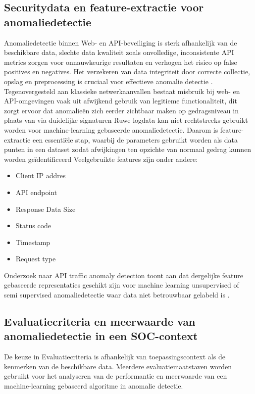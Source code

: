 \subsection{Securitydata en feature-extractie voor anomaliedetectie }

Anomaliedetectie binnen Web- en API-beveiliging is sterk afhankelijk van de beschikbare data, slechte data kwaliteit zoals onvolledige, inconsistente API metrics zorgen voor onnauwkeurige resultaten en verhogen het risico op false positives en negatives. Het verzekeren van data integriteit door correcte collectie, opslag en preprocessing is cruciaal voor effectieve anomalie detectie \Autocite{Meegle2025}.
Tegenovergesteld aan klassieke netwerkaanvallen bestaat misbruik bij web- en API-omgevingen vaak uit afwijkend gebruik van legitieme functionaliteit, dit zorgt ervoor dat anomalieën zich eerder zichtbaar maken op gedragsniveau in plaats van via duidelijke signaturen \Autocite{OWASP2023}
Ruwe logdata kan niet rechtstreeks gebruikt worden voor machine-learning gebaseerde anomaliedetectie. Daarom is feature-extractie een essentiële stap, waarbij de parameters gebruikt worden als data punten in een dataset zodat afwijkingen ten opzichte van normaal gedrag kunnen worden geïdentificeerd Veelgebruikte features zijn onder andere: 

\begin{itemize}
    \item Client IP addres
    \item API endpoint 
    \item Response Data Size
    \item Status code 
    \item Timestamp
    \item Request type
\end{itemize}

Onderzoek naar API traffic anomaly detection toont aan dat dergelijke feature gebaseerde representaties geschikt zijn voor machine learning unsupervised of semi supervised anomaliedetectie waar data niet betrouwbaar gelabeld is \Autocite{Sowmya2023}.


\subsection{Evaluatiecriteria en meerwaarde van anomaliedetectie in een SOC-context}

De keuze in Evaluatiecriteria is afhankelijk van toepassingscontext als de kenmerken van de beschikbare data. Meerdere evaluatiemaatstaven worden gebruikt voor het analyseren van de performantie en meerwaarde van een machine-learning gebaseerd algoritme in anomalie detectie\Autocite{Saabith2023}. 

